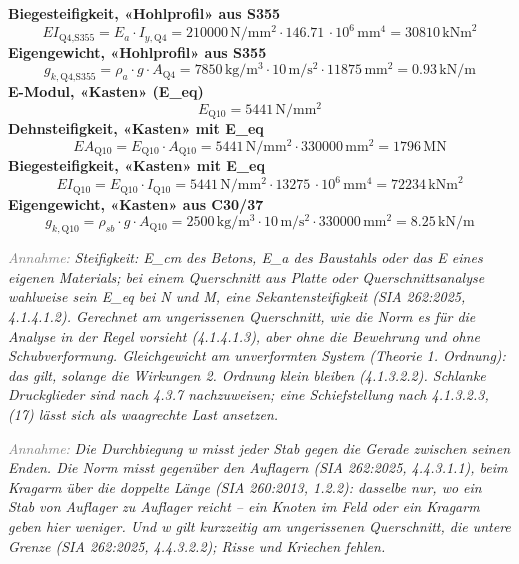 \documentclass[11pt,a4paper]{article}
\newcommand{\hinweis}[2]{\par\noindent\textcolor{gray}{\textit{#1:}} \textit{#2}\par}
\begin{document}
\noindent\textbf{Biegesteifigkeit, «Hohlprofil» aus S355}
\begin{equation*}
EI_{\text{Q4,S355}} = E_a \cdot I_{y,\text{Q4}} = 210000\,\mathrm{N}/\mathrm{mm}^{2} \cdot 146.71\,\cdot 10^{6}\,\mathrm{mm}^{4} = 30810\,\mathrm{kNm}^{2}
\end{equation*}
\noindent\textbf{Eigengewicht, «Hohlprofil» aus S355}
\begin{equation*}
g_{k,\text{Q4,S355}} = \rho_a \cdot g \cdot A_{\text{Q4}} = 7850\,\mathrm{kg}/\mathrm{m}^{3} \cdot 10\,\mathrm{m}/\mathrm{s}^{2} \cdot 11875\,\mathrm{mm}^{2} = 0.93\,\mathrm{kN}/\mathrm{m}
\end{equation*}
\noindent\textbf{E-Modul, «Kasten» (E\_eq)}
\begin{equation*}
E_{\text{Q10}} = 5441\,\mathrm{N}/\mathrm{mm}^{2}
\end{equation*}
\noindent\textbf{Dehnsteifigkeit, «Kasten» mit E\_eq}
\begin{equation*}
EA_{\text{Q10}} = E_{\text{Q10}} \cdot A_{\text{Q10}} = 5441\,\mathrm{N}/\mathrm{mm}^{2} \cdot 330000\,\mathrm{mm}^{2} = 1796\,\mathrm{MN}
\end{equation*}
\noindent\textbf{Biegesteifigkeit, «Kasten» mit E\_eq}
\begin{equation*}
EI_{\text{Q10}} = E_{\text{Q10}} \cdot I_{\text{Q10}} = 5441\,\mathrm{N}/\mathrm{mm}^{2} \cdot 13275\,\cdot 10^{6}\,\mathrm{mm}^{4} = 72234\,\mathrm{kNm}^{2}
\end{equation*}
\noindent\textbf{Eigengewicht, «Kasten» aus C30/37}
\begin{equation*}
g_{k,\text{Q10}} = \rho_{sb} \cdot g \cdot A_{\text{Q10}} = 2500\,\mathrm{kg}/\mathrm{m}^{3} \cdot 10\,\mathrm{m}/\mathrm{s}^{2} \cdot 330000\,\mathrm{mm}^{2} = 8.25\,\mathrm{kN}/\mathrm{m}
\end{equation*}
\hinweis{Annahme}{Steifigkeit: E\_cm des Betons, E\_a des Baustahls oder das E eines eigenen Materials; bei einem Querschnitt aus Platte oder Querschnittsanalyse wahlweise sein E\_eq bei N und M, eine Sekantensteifigkeit (SIA 262:2025, 4.1.4.1.2). Gerechnet am ungerissenen Querschnitt, wie die Norm es für die Analyse in der Regel vorsieht (4.1.4.1.3), aber ohne die Bewehrung und ohne Schubverformung. Gleichgewicht am unverformten System (Theorie 1. Ordnung): das gilt, solange die Wirkungen 2. Ordnung klein bleiben (4.1.3.2.2). Schlanke Druckglieder sind nach 4.3.7 nachzuweisen; eine Schiefstellung nach 4.1.3.2.3, (17) lässt sich als waagrechte Last ansetzen.}
\hinweis{Annahme}{Die Durchbiegung w misst jeder Stab gegen die Gerade zwischen seinen Enden. Die Norm misst gegenüber den Auflagern (SIA 262:2025, 4.4.3.1.1), beim Kragarm über die doppelte Länge (SIA 260:2013, 1.2.2): dasselbe nur, wo ein Stab von Auflager zu Auflager reicht – ein Knoten im Feld oder ein Kragarm geben hier weniger. Und w gilt kurzzeitig am ungerissenen Querschnitt, die untere Grenze (SIA 262:2025, 4.4.3.2.2); Risse und Kriechen fehlen.}
\end{document}
